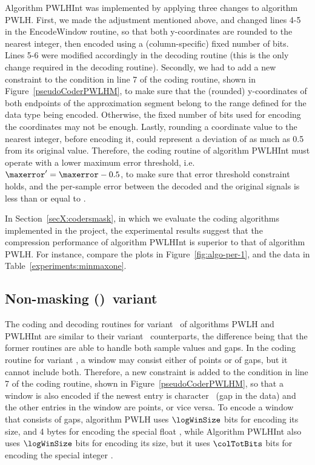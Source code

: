Algorithm PWLHInt was implemented by applying three changes to algorithm PWLH. First, we made the adjustment mentioned above, and changed lines 4-5 in the EncodeWindow routine, so that both y-coordinates are rounded to the nearest integer, then encoded using a (column-specific) fixed number of bits. Lines 5-6 were modified accordingly in the decoding routine (this is the only change required in the decoding routine). Secondly, we had to add a new constraint to the condition in line 7 of the coding routine, shown in Figure~\ref{pseudoCoderPWLHM}, to make sure that the (rounded) y-coordinates of both endpoints of the approximation segment belong to the range defined for the data type being encoded. Otherwise, the fixed number of bits used for encoding the coordinates may not be enough. Lastly, rounding a coordinate value to the nearest integer, before encoding it, could represent a deviation of as much as 0.5 from its original value. Therefore, the coding routine of algorithm PWLHInt must operate with a lower maximum error threshold, i.e. $\maxerror' = \maxerror - 0.5$, to make sure that error threshold constraint holds, and the per-sample error between the decoded and the original signals is less than or equal to \maxerror.


In Section~\ref{secX:codersmask}, in which we evaluate the coding algorithms implemented in the project, the experimental results suggest that the compression performance of algorithm PWLHInt is superior to that of algorithm PWLH. For instance, compare the plots in Figure~\ref{fig:algo-per-1}, and the data in Table~\ref{experiments:minmaxone}.




\subsection{Non-masking (\NOmaskalgo)\ variant}
\label{algo:pwhl:nmvariant}


The coding and decoding routines for variant \NOmaskalgo\ of algorithms PWLH and PWLHInt are similar to their variant \maskalgo\ counterparts, the difference being that the former routines are able to handle both sample values and gaps. In the coding routine for variant \NOmaskalgo, a window may consist either of points or of gaps, but it cannot include both. Therefore, a new constraint is added to the condition in line 7 of the coding routine, shown in Figure~\ref{pseudoCoderPWLHM}, so that a window is also encoded if the newest entry is character \noData\ (gap in the data) and the other entries in the window are points, or vice versa. To encode a window that consists of gaps, algorithm PWLH uses $\logWinSize$ bits for encoding its size, and 4 bytes for encoding the special float \nodatafloat, while Algorithm PWLHInt also uses $\logWinSize$ bits for encoding its size, but it uses $\colTotBits$ bits for encoding the special integer \nodata.

